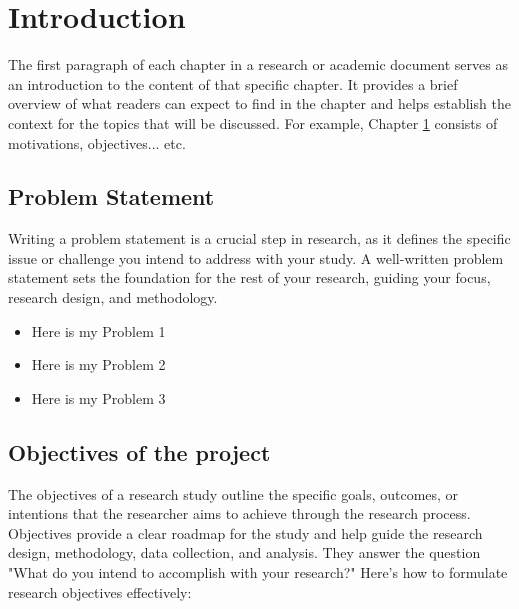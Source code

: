 \chapter{Introduction}
\label{Ch:Introduction}
The first paragraph of each chapter in a research or academic document serves as an introduction to the content of that specific chapter. It provides a brief overview of what readers can expect to find in the chapter and helps establish the context for the topics that will be discussed. For example, Chapter \ref{Ch:Introduction} consists of motivations, objectives... etc.

\section{Problem Statement}
\label{Sec:ProblemStatement}

Writing a problem statement is a crucial step in research, as it defines the specific issue or challenge you intend to address with your study. A well-written problem statement sets the foundation for the rest of your research, guiding your focus, research design, and methodology. 

\begin{itemize}
  \item  Here is my Problem 1
  \item  Here is my Problem 2
  \item  Here is my Problem 3
  \cite{Spi2020}
\end{itemize}

\section{Objectives of the project}
\label{Sec:Objective}
The objectives of a research study outline the specific goals, outcomes, or intentions that the researcher aims to achieve through the research process. Objectives provide a clear roadmap for the study and help guide the research design, methodology, data collection, and analysis. They answer the question "What do you intend to accomplish with your research?" Here's how to formulate research objectives effectively:

